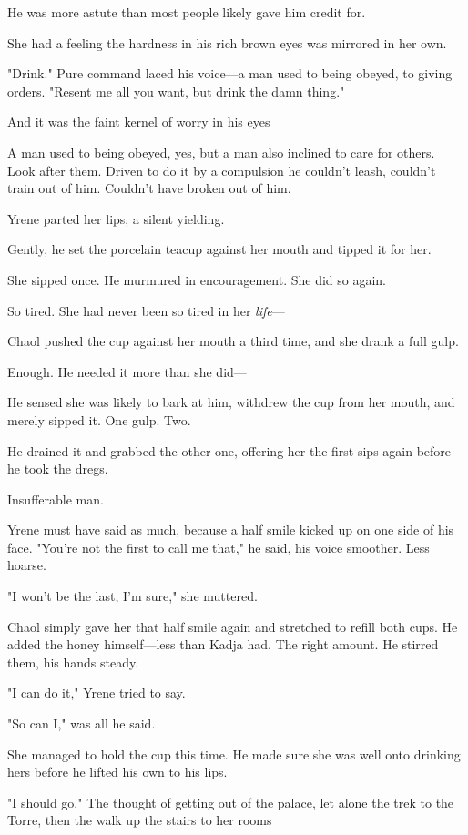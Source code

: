 He was more astute than most people likely gave him credit for.

She had a feeling the hardness in his rich brown eyes was mirrored in her own.

"Drink." Pure command laced his voice---a man used to being obeyed, to giving orders. "Resent me all you want, but drink the damn thing."

And it was the faint kernel of worry in his eyes 

A man used to being obeyed, yes, but a man also inclined to care for others. Look after them. Driven to do it by a compulsion he couldn't leash, couldn't train out of him. Couldn't have broken out of him.

Yrene parted her lips, a silent yielding.

Gently, he set the porcelain teacup against her mouth and tipped it for her.

She sipped once. He murmured in encouragement. She did so again.

So tired. She had never been so tired in her \emph{life}---

Chaol pushed the cup against her mouth a third time, and she drank a full gulp.

Enough. He needed it more than she did---

He sensed she was likely to bark at him, withdrew the cup from her mouth, and merely sipped it. One gulp. Two.

He drained it and grabbed the other one, offering her the first sips again before he took the dregs.

Insufferable man.

Yrene must have said as much, because a half smile kicked up on one side of his face. "You're not the first to call me that," he said, his voice smoother. Less hoarse.

"I won't be the last, I'm sure," she muttered.

Chaol simply gave her that half smile again and stretched to refill both cups. He added the honey himself---less than Kadja had. The right amount. He stirred them, his hands steady.

"I can do it," Yrene tried to say.

"So can I," was all he said.

She managed to hold the cup this time. He made sure she was well onto drinking hers before he lifted his own to his lips.

"I should go." The thought of getting out of the palace, let alone the trek to the Torre, then the walk up the stairs to her rooms 

